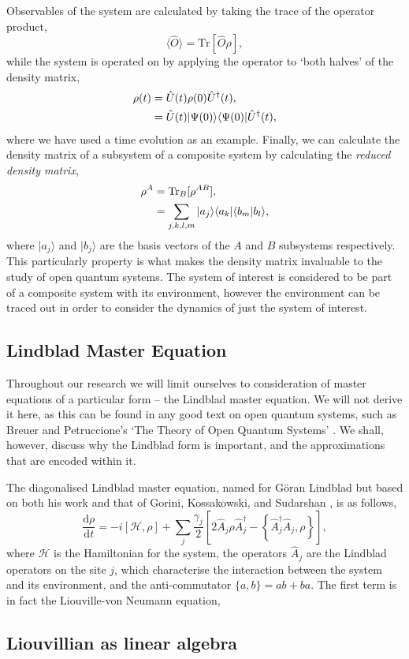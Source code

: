 Observables of the system are calculated by taking the trace of the operator product,
\begin{equation}
	\langle \hat{O} \rangle = \mathrm{Tr}[\hat{O}\rho],
	\label{eq:oqs2-5}
\end{equation}
while the system is operated on by applying the operator to `both halves' of the density matrix,
\begin{align}
	\rho (t) &= \hat{U}(t) \rho(0) \hat{U}^{\dagger}(t), \notag \\
	&= \hat{U}(t) | \Psi(0) \rangle \langle \Psi(0) | \hat{U}^{\dagger}(t),
	\label{eq:oqs2-6}
\end{align}  
where we have used a time evolution as an example. Finally, we can calculate the density matrix of a subsystem of a composite system by calculating the \emph{reduced density matrix},
\begin{align}
	\rho^{A} &= \mathrm{Tr}_{B}[\rho^{AB}], \notag \\
	&= \sum_{j,k,l,m} |a_{j} \rangle \langle a_{k}| \langle b_{m} | b_{l} \rangle,
	\label{eq:oqs2-7}
\end{align}
where \(|a_{j} \rangle\) and \(|b_{j} \rangle\) are the basis vectors of the \(A\) and \(B\) subsystems respectively. This particularly property is what makes the density matrix invaluable to the study of open quantum systems. The system of interest is considered to be part of a composite system with its environment, however the environment can be traced out in order to consider the dynamics of just the system of interest. 

\subsection{Lindblad Master Equation}
Throughout our research we will limit ourselves to consideration of master equations of a particular form -- the Lindblad master equation. We will not derive it here, as this can be found in any good text on open quantum systems, such as Breuer and Petruccione's `The Theory of Open Quantum Systems' \cite{BP_TMQME}. We shall, however, discuss why the Lindblad form is important, and the approximations that are encoded within it. 

The diagonalised Lindblad master equation, named for G\"{o}ran Lindblad but based on both his work and that of Gorini, Kossakowski, and Sudarshan \cite{Lindblad76,GKS76}, is as follows,
\begin{equation}
	\frac{\mathrm{d}\rho}{\mathrm{d}t} = -i [\mathcal{H}, \rho] + \sum_{j} \frac{\gamma_{j}}{2} \left[ 2\hat{A}_{j} \rho \hat{A}_{j}^{\dagger} - \left\{\hat{A}_{j}^{\dagger}\hat{A}_{j}, \rho\right\}\right],
	\label{eq:oqs2-8}
\end{equation}
where \(\mathcal{H}\) is the Hamiltonian for the system, the operators \(\hat{A}_{j}\) are the Lindblad operators on the site \(j\), which characterise the interaction between the system and its environment, and the anti-commutator \(\{a, b\} = ab + ba\). The first term is in fact the Liouville-von Neumann equation, 

\subsection{Liouvillian as linear algebra}   